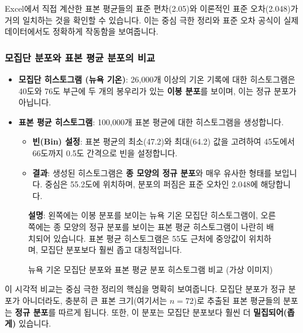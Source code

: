 \documentclass[11pt,a4paper]{book}
\theoremstyle{definition}
\begin{document}
\begin{summarybox}[title={실제와 이론의 일치}]
Excel에서 직접 계산한 표본 평균들의 표준 편차(2.05)와 이론적인 표준 오차(2.048)가 거의 일치하는 것을 확인할 수 있습니다. 이는 중심 극한 정리와 표준 오차 공식이 실제 데이터에서도 정확하게 작동함을 보여줍니다.
\end{summarybox}

\subsubsection*{모집단 분포와 표본 평균 분포의 비교}

\begin{itemize}
    \item \textbf{모집단 히스토그램 (뉴욕 기온)}: 26,000개 이상의 기온 기록에 대한 히스토그램은 40도와 76도 부근에 두 개의 봉우리가 있는 \textbf{이봉 분포}를 보이며, 이는 정규 분포가 아닙니다.
    \item \textbf{표본 평균 히스토그램}: 100,000개 표본 평균에 대한 히스토그램을 생성합니다.
    \begin{itemize}
        \item \textbf{빈(Bin) 설정}: 표본 평균의 최소(47.2)와 최대(64.2) 값을 고려하여 45도에서 66도까지 0.5도 간격으로 빈을 설정합니다.
        \item \textbf{결과}: 생성된 히스토그램은 \textbf{종 모양의 정규 분포}와 매우 유사한 형태를 보입니다. 중심은 55.2도에 위치하며, 분포의 퍼짐은 표준 오차인 2.048에 해당합니다.
    \end{itemize}
\end{itemize}

\begin{figure}[h!]
    \centering
    \caption{뉴욕 기온 모집단 분포와 표본 평균 분포 히스토그램 비교 (가상 이미지)}
    \label{fig:excel_hist_comp}
    \textbf{설명}: 왼쪽에는 이봉 분포를 보이는 뉴욕 기온 모집단 히스토그램이, 오른쪽에는 종 모양의 정규 분포를 보이는 표본 평균 히스토그램이 나란히 배치되어 있습니다. 표본 평균 히스토그램은 55도 근처에 중앙값이 위치하며, 모집단 분포보다 훨씬 좁고 대칭적입니다.
\end{figure}

\begin{summarybox}[title={CLT의 시각적 증명}]
이 시각적 비교는 중심 극한 정리의 핵심을 명확히 보여줍니다. 모집단 분포가 정규 분포가 아니더라도, 충분히 큰 표본 크기(여기서는 $n=72$)로 추출된 표본 평균들의 분포는 \textbf{정규 분포}를 따르게 됩니다. 또한, 이 분포는 모집단 분포보다 훨씬 더 \textbf{밀집되어(좁게)} 있습니다.
\end{summarybox}
\end{document}
